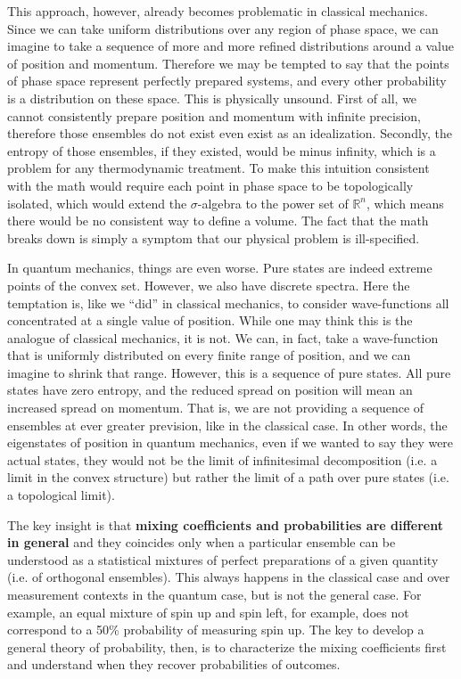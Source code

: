 \documentclass[10pt,twocolumn, nofootinbib]{revtex4-2}
\begin{document}
This approach, however, already becomes problematic in classical mechanics. Since we can take uniform distributions over any region of phase space, we can imagine to take a sequence of more and more refined distributions around a value of position and momentum. Therefore we may be tempted to say that the points of phase space represent perfectly prepared systems, and every other probability is a distribution on these space. This is physically unsound. First of all, we cannot consistently prepare position and momentum with infinite precision, therefore those ensembles do not exist even exist as an idealization. Secondly, the entropy of those ensembles, if they existed, would be minus infinity, which is a problem for any thermodynamic treatment. To make this intuition consistent with the math would require each point in phase space to be topologically isolated, which would extend the $\sigma$-algebra to the power set of $\mathbb{R}^n$, which means there would be no consistent way to define a volume. The fact that the math breaks down is simply a symptom that our physical problem is ill-specified.

In quantum mechanics, things are even worse. Pure states are indeed extreme points of the convex set. However, we also have discrete spectra. Here the temptation is, like we ``did'' in classical mechanics, to consider wave-functions all concentrated at a single value of position. While one may think this is the analogue of classical mechanics, it is not. We can, in fact, take a wave-function that is uniformly distributed on every finite range of position, and we can imagine to shrink that range. However, this is a sequence of pure states. All pure states have zero entropy, and the reduced spread on position will mean an increased spread on momentum. That is, we are not providing a sequence of ensembles at ever greater prevision, like in the classical case. In other words, the eigenstates of position in quantum mechanics, even if we wanted to say they were actual states, they would not be the limit of infinitesimal decomposition (i.e. a limit in the convex structure) but rather the limit of a path over pure states (i.e. a topological limit).

The key insight is that \textbf{mixing coefficients and probabilities are different in general} and they coincides only when a particular ensemble can be understood as a statistical mixtures of perfect preparations of a given quantity (i.e. of orthogonal ensembles). This always happens in the classical case and over measurement contexts in the quantum case, but is not the general case. For example, an equal mixture of spin up and spin left, for example, does not correspond to a 50\% probability of measuring spin up. The key to develop a general theory of probability, then, is to characterize the mixing coefficients first and understand when they recover probabilities of outcomes.
\end{document}
